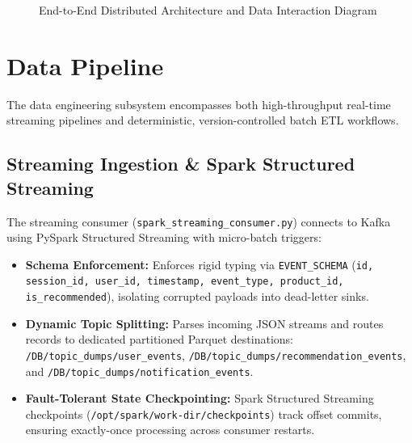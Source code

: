 \documentclass[11pt,a4paper]{article}
\begin{document}
\begin{figure}[h]
\caption{End-to-End Distributed Architecture and Data Interaction Diagram}
\label{fig:arch}
\end{figure}

\section{Data Pipeline}

The data engineering subsystem encompasses both high-throughput real-time streaming pipelines and deterministic, version-controlled batch ETL workflows.

\subsection{Streaming Ingestion \& Spark Structured Streaming}
The streaming consumer (\texttt{spark\_streaming\_consumer.py}) connects to Kafka using PySpark Structured Streaming with micro-batch triggers:
\begin{itemize}
    \item \textbf{Schema Enforcement:} Enforces rigid typing via \texttt{EVENT\_SCHEMA} (\texttt{id, session\_id, user\_id, timestamp, event\_type, product\_id, is\_recommended}), isolating corrupted payloads into dead-letter sinks.
    \item \textbf{Dynamic Topic Splitting:} Parses incoming JSON streams and routes records to dedicated partitioned Parquet destinations: \texttt{/DB/topic\_dumps/user\_events}, \texttt{/DB/topic\_dumps/recommendation\_events}, and \texttt{/DB/topic\_dumps/notification\_events}.
    \item \textbf{Fault-Tolerant State Checkpointing:} Spark Structured Streaming checkpoints (\texttt{/opt/spark/work-dir/checkpoints}) track offset commits, ensuring exactly-once processing across consumer restarts.
\end{itemize}
\end{document}
